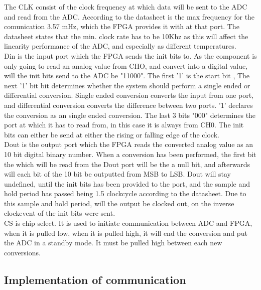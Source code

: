 The CLK consist of the clock frequency at which data will be sent to the ADC and read from the ADC. According to the datasheet is the max frequency for the comunication 3.57 mHz, which the FPGA provides it with at that port. The datasheet states that the min. clock rate has to be 10Khz as this will affect the linearity performance of the ADC,  and especially as different temperatures. \\


Din is the input port which the FPGA sends the init bits to. 
As the component is only going to read an analog value from CHO, and convert into a digital value,  will the init bits send to the ADC be "11000".  The first '1' is the start bit ,  The next '1' bit bit determines whether the system should perform a single ended or differential conversion. Single ended conversion converts the input from one port, and differential conversion converts the difference between two ports. '1' declares the conversion as an single ended conversion. The last 3 bits "000" determines the port at which it has to read from, in this case it is always from CH0. The init bits can either be send at either the rising or falling edge of the clock.   \\
  

Dout is the output port which the FPGA reads the converted analog value as an 10 bit digital binary number. When a conversion has been performed,  the first bit the which will be read from the Dout port will be the a null bit, and afterwards will each bit of the 10 bit be outputted from MSB to LSB. Dout will stay undefined, until the init bits has been provided to the port, and the sample and hold period has passed being 1.5 clockcycle according to the datasheet. Due to this sample and hold period, will the output be clocked out,  on the inverse clockevent of the init bits were sent.\\


CS is chip select. It is used to initiate communication between ADC and FPGA, when it is pulled low, when it is pulled high, it will end the conversion and put the ADC in a standby mode.  It must be pulled high between each new conversions. 
 


\subsection{Implementation of communication}

